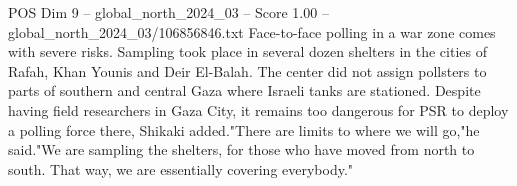 \begin{textsample}{POS Dim 9 – global\_north\_2024\_03 – Score 1.00 – global\_north\_2024\_03/106856846.txt}
Face-to-face polling in a war zone comes with severe risks.
Sampling took place in several dozen shelters in the cities of Rafah, Khan Younis and Deir El-Balah.
The center did not assign pollsters to parts of southern and central Gaza where Israeli tanks are stationed.
Despite having field researchers in Gaza City, it remains too dangerous for PSR to deploy a polling force there, Shikaki added."There are limits to where we will go,"he said."We are sampling the shelters, for those who have moved from north to south.
That way, we are essentially covering everybody."

\end{textsample}
